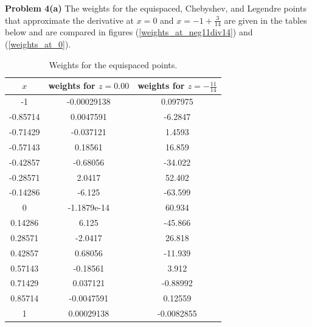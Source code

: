 \documentclass[12pt]{article}
\newcommand{\problem}[1]{\hspace{-4 ex} \large \textbf{Problem #1} }
\begin{document}
\problem{4(a)} The weights for the equispaced, Chebyshev, and Legendre points that approximate the derivative at $x=0$ and $x=-1+\tfrac{3}{14}$ are given in the tables below and are compared in figures (\ref{weights_at_neg11div14}) and (\ref{weights_at_0}). 
\begin{table}[H]
	\caption{Weights for the equispaced points.}
	\begin{center}
		\begin{tabular}{|c|c|c|}
			\hline
			$x$&weights for $z=0.00$&weights for $z=-\tfrac{11}{14}$\\ \hline
			-1&-0.00029138&0.097975\\ \hline
			-0.85714&0.0047591&-6.2847\\ \hline
			-0.71429&-0.037121&1.4593\\ \hline
			-0.57143&0.18561&16.859\\ \hline
			-0.42857&-0.68056&-34.022\\ \hline
			-0.28571&2.0417&52.402\\ \hline
			-0.14286&-6.125&-63.599\\ \hline
			0&-1.1879e-14&60.934\\ \hline
			0.14286&6.125&-45.866\\ \hline
			0.28571&-2.0417&26.818\\ \hline
			0.42857&0.68056&-11.939\\ \hline
			0.57143&-0.18561&3.912\\ \hline
			0.71429&0.037121&-0.88992\\ \hline
			0.85714&-0.0047591&0.12559\\ \hline
			1&0.00029138&-0.0082855\\ \hline
		\end{tabular}
	\end{center}
\end{table}


\end{document}
